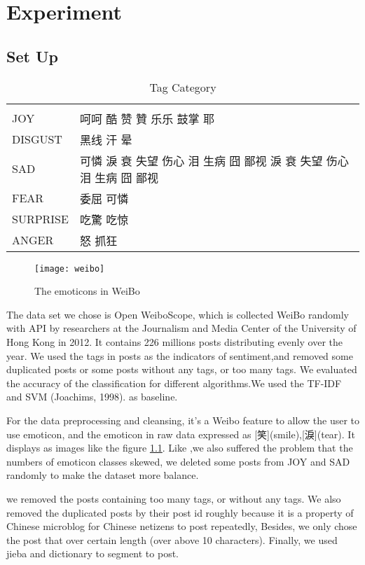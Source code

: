 \chapter{Experiment}

\section{Set Up}

\begin{table}[]
\centering
\caption{Tag Category}
\label{CategoryTable}
\begin{tabular}{ll}
      &  \\
JOY  & 呵呵 酷 赞 贊 乐乐 鼓掌 耶 \\
DISGUST & 黑线 汗 晕 \\
SAD &   可憐 淚 衰 失望 伤心 泪 生病 囧 鄙视  淚 衰 失望 伤心 泪 生病 囧 鄙视  \\
FEAR &  委屈  可憐 \\
SURPRISE &  吃驚 吃惊 \\
ANGER & 怒 抓狂
\end{tabular}
\end{table}

\begin{figure}[h]
    \centering
	\texttt{[image: weibo]}
    \caption{The emoticons in WeiBo}
    \label{fig:weibo}
\end{figure}

The data set we chose is Open WeiboScope\cite{fu2013reality}, which is collected WeiBo randomly with API by researchers at the Journalism and Media Center of the University of Hong Kong in 2012. 
It contains 226 millions posts distributing evenly over the year. We used the tags in posts as the indicators of sentiment,and removed some duplicated posts or some posts without any tags, or too many tags. 
We evaluated the accuracy of the classification for different algorithms.We used the TF-IDF and SVM (Joachims, 1998). as baseline.

For the data preprocessing and cleansing, it's a Weibo feature to allow the user to use emoticon, 
and the emoticon in raw data expressed as [笑](smile),[淚](tear). It displays as images like the figure \ref{fig:weibo}. 
Like \cite{zhao2012moodlens},we also suffered the problem that the numbers of emoticon classes skewed,
 we deleted some posts from JOY and SAD randomly to make the dataset more balance.  

we removed the posts containing too many tags, or without any tags. We also removed the duplicated posts by their post id roughly because it is a property of Chinese microblog \cite{fu2013reality} for Chinese netizens to post repeatedly, 
Besides, we only chose the post that over certain length (over above 10 characters). Finally, we used jieba and dictionary to segment to post.

